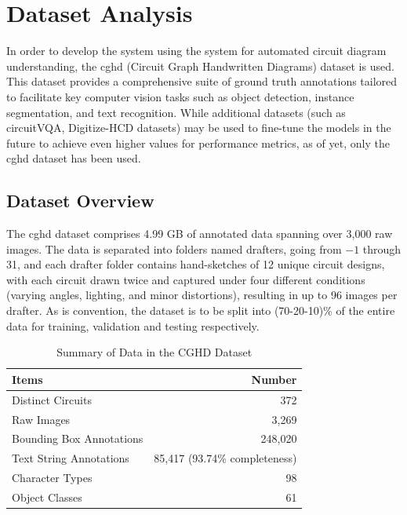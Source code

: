 \section{Dataset Analysis}

In order to develop the system using the system for automated circuit diagram understanding, the \gls{cghd} (Circuit Graph Handwritten Diagrams) dataset is used. This dataset provides a comprehensive suite of ground truth annotations tailored to facilitate key computer vision tasks such as object detection, instance segmentation, and text recognition. While additional datasets (such as circuitVQA, Digitize-HCD datasets) may be used to fine-tune the models in the future to achieve even higher values for performance metrics, as of yet, only the \gls{cghd} dataset has been used.

\subsection{Dataset Overview}

The \gls{cghd} dataset comprises 4.99 GB of annotated data spanning over 3,000 raw images. The data is separated into folders named drafters, going from $-1$ through 31, and each drafter folder contains hand-sketches of 12 unique circuit designs, with each circuit drawn twice and captured under four different conditions (varying angles, lighting, and minor distortions), resulting in up to 96 images per drafter. As is convention, the dataset is to be split into (70-20-10)\% of the entire data for training, validation and testing respectively.

\begin{table}[H]
    \centering
    \caption{Summary of Data in the CGHD Dataset}
    \label{table:cghd-summary}
    \begin{tabular}{lr}
        \toprule
        \textbf{Items} & \textbf{Number} \\
        \midrule
        Distinct Circuits & 372 \\
        Raw Images & 3,269 \\
        Bounding Box Annotations & 248,020 \\
        Text String Annotations & 85,417 (93.74\% completeness) \\
        Character Types & 98 \\
        Object Classes & 61 \\
        \bottomrule
    \end{tabular}
\end{table}

